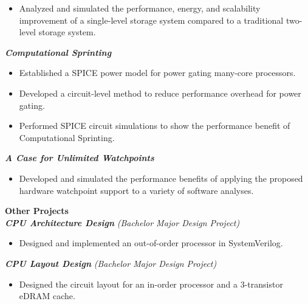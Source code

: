 \documentclass{res}
\begin{document}
\begin{resume}
\begin{itemize}
  \item Analyzed and simulated the performance, energy, and scalability improvement of a single-level storage system compared to a traditional two-level storage system.
\end{itemize}
{\bf \em Computational Sprinting}
\begin{itemize} \itemsep -2pt %
  \item Established a SPICE power model for power gating many-core processors.
  \item Developed a circuit-level method to reduce performance overhead for power gating.
  \item Performed SPICE circuit simulations to show the performance benefit of Computational Sprinting.
\end{itemize}
{\bf \em A Case for Unlimited Watchpoints}
\begin{itemize} \itemsep -2pt %
  \item Developed and simulated the performance benefits of applying the proposed hardware watchpoint support to a variety of software analyses.
\end{itemize}
{\bf Other Projects} \vspace{2pt} \\
{\bf \em CPU Architecture Design} {\em (Bachelor Major Design Project)}
\begin{itemize} \itemsep -2pt %
  \item Designed and implemented an out-of-order processor in SystemVerilog.
\end{itemize}
{\bf \em CPU Layout Design} {\em (Bachelor Major Design Project)}
\begin{itemize} \itemsep -2pt %
  \item Designed the circuit layout for an in-order processor and a 3-transistor
    eDRAM cache.
\end{itemize}
\vspace{-6pt}


\vspace{0.2in}

\end{resume}
\end{document}

